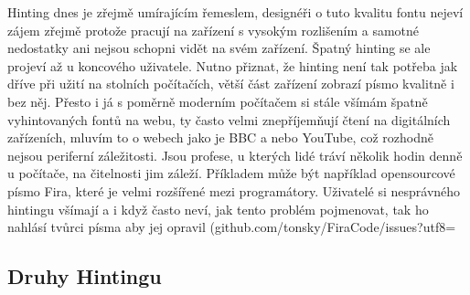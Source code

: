 \documentclass[a4paper]{article}
\begin{document}
Hinting dnes je zřejmě umírajícím řemeslem, designéři o tuto kvalitu fontu nejeví zájem zřejmě protože pracují na zařízení s vysokým rozlišením a samotné nedostatky ani nejsou schopni vidět na svém zařízení. Špatný hinting se ale projeví až u koncového uživatele. Nutno přiznat, že hinting není tak potřeba jak dříve při užití na stolních počítačích, větší část zařízení zobrazí písmo kvalitně i bez něj. Přesto i já s poměrně moderním počítačem si stále všímám špatně vyhintovaných fontů na webu, ty často velmi znepříjemňují čtení na digitálních zařízeních, mluvím to o webech jako je BBC a nebo YouTube, což rozhodně nejsou periferní záležitosti. Jsou profese, u kterých lidé tráví několik hodin denně u počítače, na čitelnosti jim záleží. Příkladem může být například opensourcové písmo Fira, které je velmi rozšířené mezi programátory. Uživatelé si nesprávného hintingu všímají a i když často neví, jak tento problém pojmenovat, tak ho nahlásí tvůrci písma aby jej opravil (github.com/tonsky/FiraCode/issues?utf8=%


\subsection{Druhy Hintingu}
\end{document}
